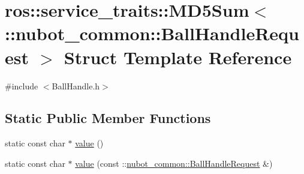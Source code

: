 \hypertarget{structros_1_1service__traits_1_1MD5Sum_3_01_1_1nubot__common_1_1BallHandleRequest_01_4}{\section{ros\-:\-:service\-\_\-traits\-:\-:M\-D5\-Sum$<$ \-:\-:nubot\-\_\-common\-:\-:Ball\-Handle\-Request $>$ Struct Template Reference}
\label{structros_1_1service__traits_1_1MD5Sum_3_01_1_1nubot__common_1_1BallHandleRequest_01_4}
}


{\ttfamily \#include $<$Ball\-Handle.\-h$>$}

\subsection*{Static Public Member Functions}
\begin{DoxyCompactItemize}
\item 
static const char $\ast$ \hyperlink{structros_1_1service__traits_1_1MD5Sum_3_01_1_1nubot__common_1_1BallHandleRequest_01_4_ad5b0871526ab7aaf3d4fc54f1d5ad61c}{value} ()
\item 
static const char $\ast$ \hyperlink{structros_1_1service__traits_1_1MD5Sum_3_01_1_1nubot__common_1_1BallHandleRequest_01_4_a8b397adfa8aaa8ea9c20b0b78f52797c}{value} (const \-::\hyperlink{namespacenubot__common_a100386a9c64318b13fb31e4548774326}{nubot\-\_\-common\-::\-Ball\-Handle\-Request} \&)
\end{DoxyCompactItemize}


